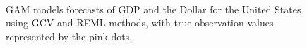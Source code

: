 \documentclass[11pt,regno]{amsart}
\theoremstyle{plain}
\numberwithin{equation}{section}
\begin{document}
\begin{figure}
\centering
\centerline{ \mbox{
}}
\caption{GAM models forecasts of GDP and the Dollar for the United States using GCV and REML methods, with true observation values represented by the pink dots.}
\end{figure}
\end{document}
